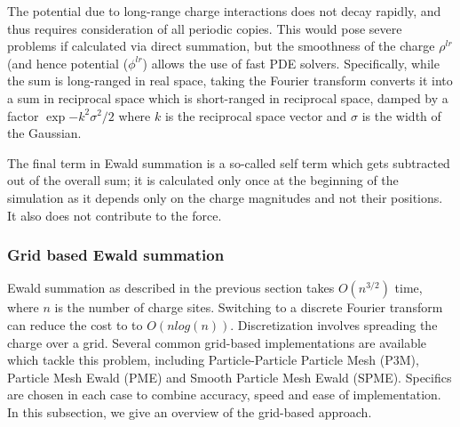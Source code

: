 \documentclass[9pt,bestpractices]{livecoms}
\begin{document}
The potential due to long-range charge interactions does not decay rapidly, and thus requires consideration of all periodic copies.
This would pose severe problems if calculated via direct summation, but the smoothness of the charge $\rho^{lr}$ (and hence potential ($\phi^{lr}$) allows the use of fast PDE solvers. 
Specifically, while the sum is long-ranged in real space, taking the Fourier transform converts it into a sum in reciprocal space which is short-ranged in reciprocal space, damped by a factor $\exp{-k^2 \sigma^2/2}$ where $k$ is the reciprocal space vector and $\sigma$ is the width of the Gaussian. 

The final term in Ewald summation is a so-called self term which gets subtracted out of the overall sum; it is calculated only once at the beginning of the simulation as it depends only on the charge magnitudes and not their positions.
It also does not contribute to the force.


\subsubsection{Grid based Ewald summation}

Ewald summation as described in the previous section takes $O(n^{3/2})$ time, where $n$ is the number of charge sites.
Switching to a discrete Fourier transform can reduce the cost to to $O(n log(n))$.
Discretization involves spreading the charge over a grid. 
Several common grid-based implementations are available which tackle this problem, including Particle-Particle Particle Mesh (P3M), Particle Mesh Ewald (PME) and Smooth Particle Mesh Ewald (SPME). 
Specifics are chosen in each case to combine accuracy, speed and ease of implementation.
In this subsection, we give an overview of the grid-based approach.
\end{document}
